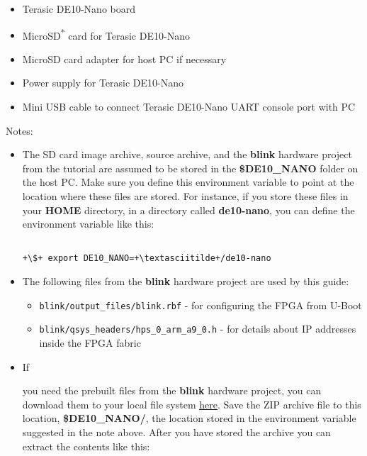 \begin{flushleft}
\begin{itemize}
\begin{itemize}
\end{itemize}
\item Terasic DE10-Nano board
\item MicroSD\textsuperscript{*} card for Terasic DE10-Nano
\item MicroSD card adapter for host PC if necessary
\item Power supply for Terasic DE10-Nano
\item Mini USB cable to connect Terasic DE10-Nano UART console port with PC

\end{itemize}

Notes:

\begin{itemize}

\item The SD card image archive, source archive, and the \textbf{blink} hardware project from the  tutorial are assumed to be stored in the \textbf{\$DE10\_NANO} folder on the host PC. Make sure you define this environment variable to point at the location where these files are stored. For instance, if you store these files in your \textbf{HOME} directory, in a directory called \textbf{de10-nano}, you can define the environment variable like this:

\begin{verbatim}

+\$+ export DE10_NANO=+\textasciitilde+/de10-nano

\end{verbatim}

\item The following files from the \textbf{blink} hardware project are used by this guide:

\begin{itemize}

\item \texttt{blink/output\_files/blink.rbf} - for configuring the FPGA from U-Boot

\item \texttt{blink/qsys\_headers/hps\_0\_arm\_a9\_0.h} - for details about IP addresses inside the FPGA fabric

\end{itemize}

\item \hypertarget{blinkArchive}{If} you need the prebuilt files from the \textbf{blink} hardware project, you can download them to your local file system \href{\TheReleasesURL/blink_for_uboot.zip}{\underline{here}}.  Save the ZIP archive file to this location, \textbf{\$DE10\_NANO/}, the location stored in the environment variable suggested in the note above.  After you have stored the archive you can extract the contents like this:


\end{itemize}
\end{flushleft}
